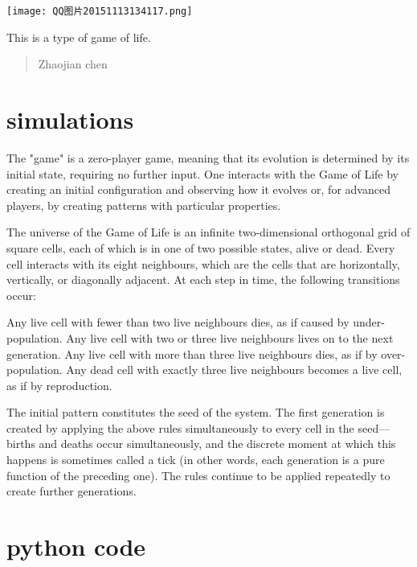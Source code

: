 \begin{marginfigure}%
	\texttt{[image: QQ图片20151113134117.png]}
	\caption{This is a type of game of life.}
	\label{fig:marginfig}
\end{marginfigure}
\begin{abstract}
\noindent
Zhaojian chen
\end{abstract}

\normalsize

\vspace{1cm}
\section{simulations}

The "game" is a zero-player game, meaning that its evolution is determined by its initial state, requiring no further input. One interacts with the Game of Life by creating an initial configuration and observing how it evolves or, for advanced players, by creating patterns with particular properties.



	
The universe of the Game of Life is an infinite two-dimensional orthogonal grid of square cells, each of which is in one of two possible states, alive or dead. Every cell interacts with its eight neighbours, which are the cells that are horizontally, vertically, or diagonally adjacent. At each step in time, the following transitions occur:

Any live cell with fewer than two live neighbours dies, as if caused by under-population.
Any live cell with two or three live neighbours lives on to the next generation.
Any live cell with more than three live neighbours dies, as if by over-population.
Any dead cell with exactly three live neighbours becomes a live cell, as if by reproduction.

The initial pattern constitutes the seed of the system. The first generation is created by applying the above rules simultaneously to every cell in the seed—births and deaths occur simultaneously, and the discrete moment at which this happens is sometimes called a tick (in other words, each generation is a pure function of the preceding one). The rules continue to be applied repeatedly to create further generations.

\vspace{1cm}

\section{python code}




